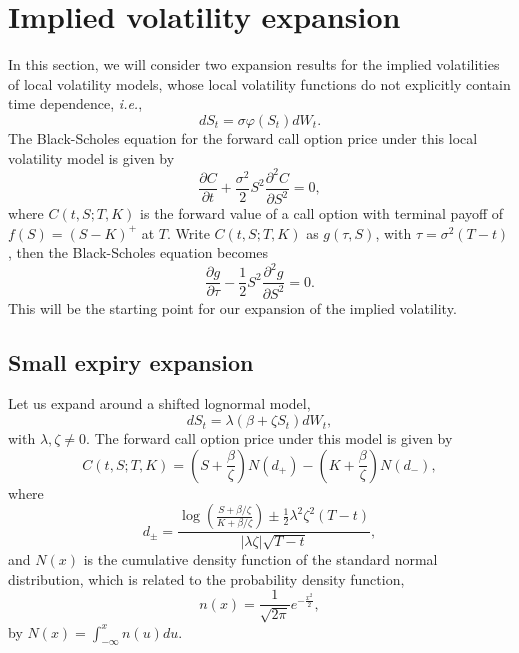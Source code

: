 \documentclass[12pt]{article}
\begin{document}
\section{Implied volatility expansion}

  In this section, we will consider two expansion results for the implied volatilities of local volatility models,
  whose local volatility functions do not explicitly contain time dependence, {\it i.e.},
  \begin{equation}
    dS_t=\sigma\varphi(S_t)dW_t.
    \label{expansion1}
  \end{equation}
  The Black-Scholes equation for the forward call option price under this local volatility model is given by
  \begin{equation}
    \frac{\partial C}{\partial t} +\frac{\sigma^2}{2}S^2\frac{\partial^2C}{\partial S^2} = 0,
  \end{equation}
  where $C(t,S;T,K)$ is the forward value of a call option with terminal payoff of $f(S)=(S-K)^+$ at $T$. Write
  $C(t,S;T,K)$ as $g(\tau,S)$, with $\tau=\sigma^2(T-t)$, then the Black-Scholes equation becomes
  \begin{equation}
    \frac{\partial g}{\partial \tau} -\frac{1}{2}S^2\frac{\partial^2g}{\partial S^2} = 0.
    \label{expansion2}
  \end{equation}
  This will be the starting point for our expansion of the implied volatility.


  \subsection{Small expiry expansion}

    Let us expand around a shifted lognormal model,
    \begin{equation}
      dS_t=\lambda(\beta+\zeta S_t)dW_t,
    \end{equation}
    with $\lambda, \zeta\neq 0$. The forward call option price under this model is given by
    \begin{equation}
      C(t,S;T,K)=\left(S+\frac{\beta}{\zeta}\right)N(d_+) - \left(K+\frac{\beta}{\zeta}\right)N(d_-),
    \end{equation}
    where
    \begin{equation}
      d_{\pm} = \frac{\log\left(\frac{S+\beta / \zeta}{K+\beta / \zeta}\right)\pm \frac{1}{2}\lambda^2\zeta^2(T-t)}
                     {|\lambda\zeta|\sqrt{T-t}},
    \end{equation}
    and $N(x)$ is the cumulative density function of the standard normal distribution, which is related to the probability
    density function,
    \begin{equation}
      n(x) = \frac{1}{\sqrt{2\pi}}e^{-\frac{x^2}{2}},
    \end{equation}
    by $N(x)=\int_{-\infty}^xn(u)du$.
\end{document}
